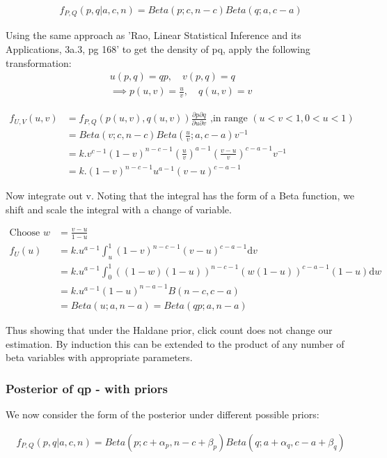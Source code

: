 \documentclass[11pt,a4,singlespacing,titlepagenumber=on]{scrreprt}
\numberwithin{equation}{chapter} %
\theoremstyle{remark}
\begin{document}
\begin{align}
 f_{P,Q}(p,q|a,c,n) = Beta(p;c,n-c) Beta(q;a,c-a)
\end{align}

Using the same approach as 'Rao, Linear Statistical Inference and its Applications, 3a.3, pg 168' to get the density of pq, apply the following transformation:
\begin{align}
 u(p,q) = qp, \quad v(p,q) = q  \\
 \implies p(u,v) = \frac{u}{v}, \quad q(u,v) = v
\end{align}

\begin{align}
 f_{U,V}(u,v) &= f_{P,Q}(p(u,v),q(u,v)) 
		\frac{\partial p \partial q}{\partial u \partial v} 
		\text{ ,in range }  (u<v<1,0<u<1) \\
 &= Beta(v;c,n-c) Beta(\frac{u}{v};a,c-a) v^{-1} \\
 &= k . v^{c-1} (1-v)^{n-c-1} (\frac{u}{v})^{a-1} (\frac{v - u}{v})^{c-a-1} v^{-1} \\
 &= k . (1-v)^{n-c-1} u^{a-1} (v - u)^{c-a-1}
\end{align}

Now integrate out v. Noting that the integral has the form of a Beta function, we shift and scale the integral with a change of variable.

\begin{align}
\text{Choose }  w &= \frac{v-u}{1-u} \\
f_U(u) &= k.u^{a-1} \int_u^1 (1-v)^{n-c-1} (v - u)^{c-a-1} \mathrm{d}v \\
 &= k.u^{a-1} \int_0^1 ((1-w)(1-u))^{n-c-1} (w(1-u))^{c-a-1} (1-u) \mathrm{d}w \\
 &= k.u^{a-1} (1-u)^{n-a-1} B(n-c,c-a) \\
 &= Beta(u;a,n-a) = Beta(qp;a,n-a) 
\end{align}

Thus showing that under the Haldane prior, click count does not change our estimation. By induction this can be extended to the product of any number of beta variables with appropriate parameters.

\subsubsection{Posterior of qp - with priors}

We now consider the form of the posterior under different possible priors:

\begin{align}
 f_{P,Q}(p,q|a,c,n) = Beta(p;c+\alpha_p,n-c+\beta_p) Beta(q;a+\alpha_q,c-a+\beta_q)
\end{align}
\end{document}

